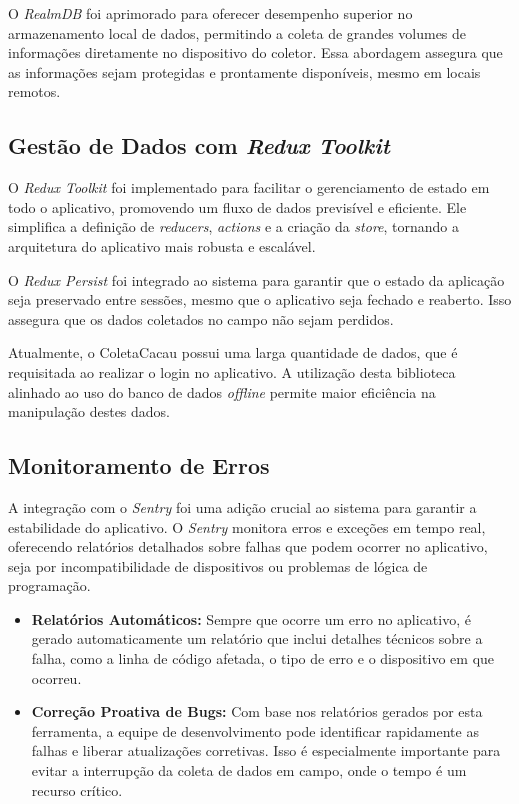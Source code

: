 O \textit{RealmDB} foi aprimorado para oferecer desempenho superior no armazenamento local de dados, permitindo a coleta de grandes volumes de informações diretamente no dispositivo do coletor. Essa abordagem assegura que as informações sejam protegidas e prontamente disponíveis, mesmo em locais remotos.

\subsection{Gestão de Dados com \textit{Redux Toolkit}}
O \textit{Redux Toolkit} foi implementado para facilitar o gerenciamento de estado em todo o aplicativo, promovendo um fluxo de dados previsível e eficiente. Ele simplifica a definição de \textit{reducers}, \textit{actions} e a criação da \textit{store}, tornando a arquitetura do aplicativo mais robusta e escalável.

O \textit{Redux Persist} foi integrado ao sistema para garantir que o estado da aplicação seja preservado entre sessões, mesmo que o aplicativo seja fechado e reaberto. Isso assegura que os dados coletados no campo não sejam perdidos.

Atualmente, o ColetaCacau possui uma larga quantidade de dados, que é requisitada ao realizar o login no aplicativo. A utilização desta biblioteca alinhado ao uso do banco de dados \textit{offline} permite maior eficiência na manipulação destes dados.

\subsection{Monitoramento de Erros}
A integração com o \textit{Sentry} foi uma adição crucial ao sistema para garantir a estabilidade do aplicativo. O \textit{Sentry} monitora erros e exceções em tempo real, oferecendo relatórios detalhados sobre falhas que podem ocorrer no aplicativo, seja por incompatibilidade de dispositivos ou problemas de lógica de programação.

\begin{itemize}
    \item \textbf{Relatórios Automáticos:} Sempre que ocorre um erro no aplicativo, é gerado automaticamente um relatório que inclui detalhes técnicos sobre a falha, como a linha de código afetada, o tipo de erro e o dispositivo em que ocorreu.

    \item \textbf{Correção Proativa de Bugs:} Com base nos relatórios gerados por esta ferramenta, a equipe de desenvolvimento pode identificar rapidamente as falhas e liberar atualizações corretivas. Isso é especialmente importante para evitar a interrupção da coleta de dados em campo, onde o tempo é um recurso crítico.
\end{itemize}

